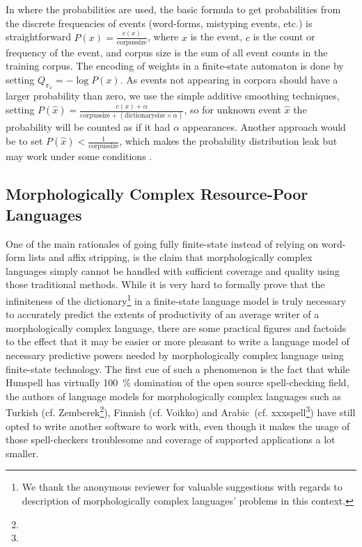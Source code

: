 \documentclass[a4paper,12pt]{article}
\begin{document}
In where the probabilities are used, the basic formula to get probabilities
from the discrete frequencies of events (word-forms, mistyping events, etc.) is
straightforward $P(x) = \frac{c(x)}{\mathrm{corpus size}}$, where $x$ is the
event, $c$ is the count or frequency of the event, and corpus size is the sum
of all event counts in the training corpus. The encoding of weights in a
finite-state automaton is done by setting $Q_{\pi_x} = -\log P(x)$.  As events
not appearing in corpora should have a larger probability than zero, we use the
simple additive smoothing techniques, setting $P(\hat{x}) = \frac{c(x) +
\alpha}{\mathrm{corpus size} + (\mathrm{dictionary size} \times \alpha)}$, so
for unknown event $\hat{x}$ the probability will be counted as if it had
$\alpha$ appearances.  Another approach would be to set $P(\hat{x}) <
\frac{1}{\mathrm{corpus size}}$, which makes the probability distribution leak
but may work under some conditions \cite[]{brants2007large}.

\subsection{Morphologically Complex Resource-Poor Languages}
\label{subsec:morphologically-complex}

One of the main rationales of going fully finite-state instead of relying on
word-form lists and affix stripping, is the claim that morphologically complex
languages simply cannot be handled with sufficient coverage and quality using
those traditional methods. While it is very hard to formally prove that the
infiniteness of the dictionary\footnote{We thank the anonymous reviewer for
valuable suggestions with regards to description of morphologically complex
languages' problems in this context.} in a finite-state language model is truly
necessary to accurately predict the extents of productivity of an average
writer of a morphologically complex language, there are some practical figures
and factoids to the effect that it may be easier or more pleasant to write a
language model of necessary predictive powers needed by morphologically complex
language using finite-state technology. The first cue of such a phenomenon is
the fact that while Hunspell has virtually 100~\% domination of the open source
spell-checking field, the authors of language models for morphologically
complex languages such as Turkish (cf.  Zemberek\footnote{}), Finnish (cf.
Voikko) and Arabic~(cf.  xxxspell\footnote{}) have still opted to write another
software to work with, even though it makes the usage of those spell-checkers
troublesome and coverage of supported applications a lot smaller.
\end{document}
